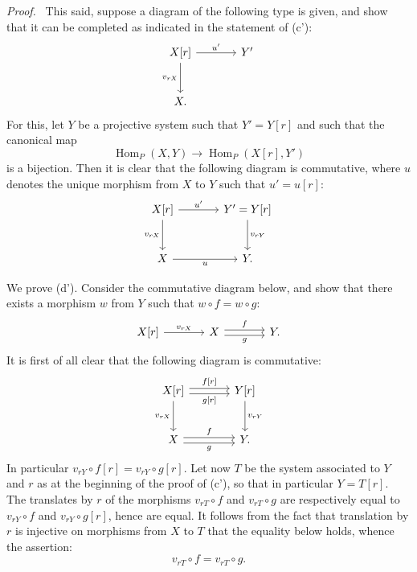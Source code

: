 \documentclass[11pt]{article}
\newenvironment{prooftext}[1][Proof]{\par\noindent\emph{#1.}\ }{\par\medskip}
\DeclareMathOperator{\Hom}{Hom}
\providecommand{\Hom}{\operatorname{Hom}}
\providecommand{\Hom}{\operatorname{Hom}}
\begin{document}
\begin{prooftext}[Proof]
This said, suppose a diagram of the following type is given, and show that it can be completed as indicated in the statement of (c'):
\[
\begin{tikzcd}[column sep=large,row sep=large]
X[r] \arrow[r,"u'"] \arrow[d,"{v_{rX}}"'] & Y'\\
X .
\end{tikzcd}
\]
For this, let $Y$ be a projective system such that $Y'=Y[r]$ and such that the canonical map
\[
\Hom_P(X,Y)\longrightarrow\Hom_P(X[r],Y')
\]
is a bijection. Then it is clear that the following diagram is commutative, where $u$ denotes the unique morphism from $X$ to $Y$ such that $u'=u[r]$:
\[
\begin{tikzcd}[column sep=large,row sep=large]
X[r] \arrow[r,"u'"] \arrow[d,"{v_{rX}}"'] & Y'=Y[r] \arrow[d,"{v_{rY}}"]\\
X \arrow[r,"u"'] & Y .
\end{tikzcd}
\]

We prove (d'). Consider the commutative diagram below, and show that there exists a morphism $w$ from $Y$ such that $w\circ f=w\circ g$:
\[
\begin{tikzcd}[column sep=large]
X[r] \arrow[r,"{v_{rX}}"] & X \arrow[r,shift left,"f"] \arrow[r,shift right,"g"'] & Y .
\end{tikzcd}
\]
It is first of all clear that the following diagram is commutative:
\[
\begin{tikzcd}[column sep=large,row sep=large]
X[r] \arrow[r,shift left,"{f[r]}"] \arrow[r,shift right,"{g[r]}"'] \arrow[d,"{v_{rX}}"'] & Y[r] \arrow[d,"{v_{rY}}"]\\
X \arrow[r,shift left,"f"] \arrow[r,shift right,"g"'] & Y .
\end{tikzcd}
\]
In particular $v_{rY}\circ f[r]=v_{rY}\circ g[r]$. Let now $T$ be the system associated to $Y$ and $r$ as at the beginning of the proof of (c'), so that in particular $Y=T[r]$. The translates by $r$ of the morphisms $v_{rT}\circ f$ and $v_{rT}\circ g$ are respectively equal to $v_{rY}\circ f$ and $v_{rY}\circ g[r]$, hence are equal. It follows from the fact that translation by $r$ is injective on morphisms from $X$ to $T$ that the equality below holds, whence the assertion:
\[
v_{rT}\circ f=v_{rT}\circ g.
\]
\end{prooftext}
\end{document}
